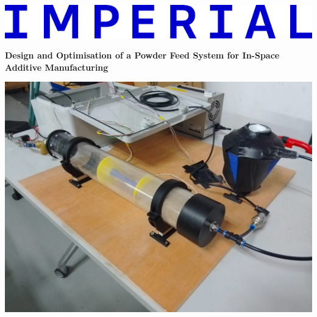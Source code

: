 \documentclass[11pt,a4paper]{report}
\begin{document}
\begin{titlepage}

    \noindent
    \begin{minipage}{0.5\textwidth}
        \includegraphics[width=\linewidth]{../report_assets/imperial.png}
    \end{minipage}
    \hfill
    
    \vspace{1cm} %
    \begin{center}
        {\huge \textbf{Design and Optimisation of a Powder Feed System for In-Space Additive Manufacturing}}\\[1cm]
        
        \begin{minipage}{0.9\textwidth}
            \includegraphics[width=\linewidth]{../report_assets/cover_image.png}
        \end{minipage}
        \hfill
        
        \vspace{0.3cm} %


\end{center}
\end{titlepage}
\end{document}
